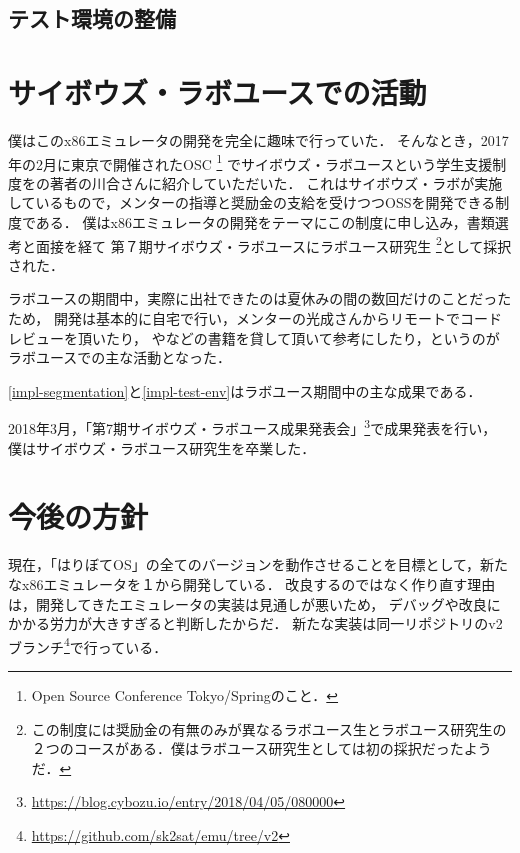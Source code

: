 \documentclass[10pt,a4j]{jsarticle}
\begin{document}
\subsection{テスト環境の整備\label{impl-test-env}}



\section{サイボウズ・ラボユースでの活動}

僕はこのx86エミュレータの開発を完全に趣味で行っていた．
そんなとき，2017年の2月に東京で開催されたOSC
\footnote{Open Source Conference Tokyo/Springのこと．}
でサイボウズ・ラボユースという学生支援制度を\cite{30days-osdev}の著者の川合さんに紹介していただいた．
これはサイボウズ・ラボが実施しているもので，メンターの指導と奨励金の支給を受けつつOSSを開発できる制度である．
僕はx86エミュレータの開発をテーマにこの制度に申し込み，書類選考と面接を経て
第７期サイボウズ・ラボユースにラボユース研究生
\footnote{この制度には奨励金の有無のみが異なるラボユース生とラボユース研究生の２つのコースがある．僕はラボユース研究生としては初の採択だったようだ．}として採択された．

ラボユースの期間中，実際に出社できたのは夏休みの間の数回だけのことだったため，
開発は基本的に自宅で行い，メンターの光成さんからリモートでコードレビューを頂いたり，
\cite{read-486}や\cite{effective-cpp}などの書籍を貸して頂いて参考にしたり，というのがラボユースでの主な活動となった．

\ref{impl-segmentation}と\ref{impl-test-env}はラボユース期間中の主な成果である．

2018年3月，「第7期サイボウズ・ラボユース成果発表会」\footnote{\url{https://blog.cybozu.io/entry/2018/04/05/080000}}で成果発表を行い，
僕はサイボウズ・ラボユース研究生を卒業した．

\section{今後の方針}

現在，「はりぼてOS」の全てのバージョンを動作させることを目標として，新たなx86エミュレータを１から開発している．
改良するのではなく作り直す理由は，開発してきたエミュレータの実装は見通しが悪いため，
デバッグや改良にかかる労力が大きすぎると判断したからだ．
新たな実装は同一リポジトリのv2ブランチ\footnote{\url{https://github.com/sk2sat/emu/tree/v2}}で行っている．
\end{document}
